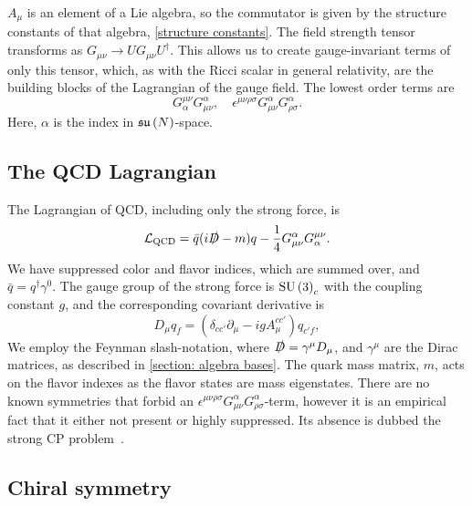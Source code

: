 %
$A_\mu$ is an element of a Lie algebra, so the commutator is given by the structure constants of that algebra, \autoref{structure constants}.
The field strength tensor transforms as $G_{\mu\nu} \rightarrow U G_{\mu \nu}U^\dagger$.
This allows us to create gauge-invariant terms of only this tensor, which, as with the Ricci scalar in general relativity, are the building blocks of the Lagrangian of the gauge field.
The lowest order terms are
%
\begin{equation}
    G^{\mu \nu}_\alpha G_{\mu \nu}^\alpha, \quad
    \epsilon^{\mu \nu \rho \sigma} G_{\mu \nu}^\alpha G_{\rho \sigma}^\alpha.
\end{equation}
%
Here, $\alpha$ is the index in $\mathfrak{su}\left(N\right)$-space.



\subsection{The QCD Lagrangian}

The Lagrangian of QCD, including only the strong force, is
%
\begin{equation}
    \mathcal{L}_{\text{QCD}} 
    = \bar q (i \slashed D - m)q - \frac{1}{4} G_{\mu \nu}^\alpha G^{\mu \nu}_\alpha.
\end{equation}
%
We have suppressed color and flavor indices, which are summed over, and $\bar q = q^\dagger \gamma^0$.
The gauge group of the strong force is $\text{SU}\left(3\right)_c$ with the coupling constant $g$, and the corresponding covariant derivative is
%
\begin{equation}
    D_\mu q_f =  (\delta_{cc'} \partial_\mu - i g A_\mu^{cc'}) q_{c'f},
\end{equation}
%
We employ the Feynman slash-notation, where $\slashed D = \gamma^\mu D_\mu$, and $\gamma^\mu$ are the Dirac matrices, as described in \autoref{section: algebra bases}.
The quark mass matrix, $m$, acts on the flavor indexes as the flavor states are mass eigenstates.
There are no known symmetries that forbid an $\epsilon^{\mu \nu \rho \sigma} G_{\mu \nu}^\alpha G_{\rho \sigma}^\alpha$-term, however it is an empirical fact that it either not present or highly suppressed. 
Its absence is dubbed the strong CP problem~\autocite{schwartzQuantumFieldTheory2013}.



\subsection{Chiral symmetry}
\label{subsection: chiral symmetry}

